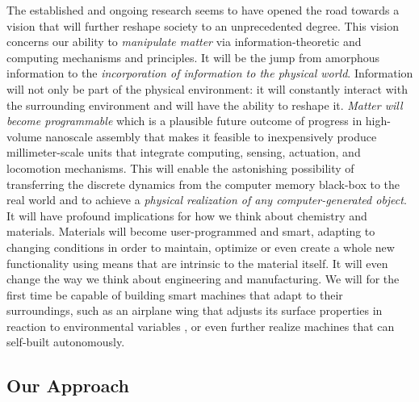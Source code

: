 \documentclass[oribibl, 11pt]{llncs}
\begin{document}
The established and ongoing research seems to have opened the road towards a vision that will further reshape society to an unprecedented degree. This vision concerns our ability to \emph{manipulate matter} via information-theoretic and computing mechanisms and principles. It will be the jump from amorphous information to the \emph{incorporation of information to the physical world}. Information will not only be part of the physical environment: it will constantly interact with the surrounding environment and will have the ability to reshape it. \emph{Matter will become programmable} \cite{GCJM05} which is a plausible future outcome of progress in high-volume nanoscale assembly that makes it feasible to inexpensively produce millimeter-scale units that integrate computing, sensing, actuation, and locomotion mechanisms. This will enable the astonishing possibility of transferring the discrete dynamics from the computer memory black-box to the real world and to achieve a \emph{physical realization of any computer-generated object}. It will have profound implications for how we think about chemistry and materials. Materials will become user-programmed and smart, adapting to changing conditions in order to maintain, optimize or even create a whole new functionality using means that are intrinsic to the material itself. It will even change the way we think about engineering and manufacturing. We will for the first time be capable of building smart machines that adapt to their surroundings, such as an airplane wing that adjusts its surface properties in reaction to environmental variables \cite{Za07}, or even further realize machines that can self-built autonomously.

\subsection{Our Approach}
\end{document}
